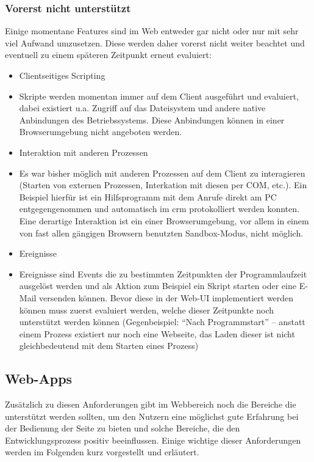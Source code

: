 \subsubsection{Vorerst nicht unterstützt}
Einige momentane Features sind im Web entweder gar nicht oder nur mit sehr viel Aufwand umzusetzen. Diese werden daher vorerst nicht weiter beachtet und eventuell zu einem späteren Zeitpunkt erneut evaluiert:

\begin{itemize}
    \item{Clientseitiges Scripting}
    \item[] Skripte werden momentan immer auf dem Client ausgeführt und evaluiert, dabei existiert u.a. Zugriff auf das Dateisystem und andere native Anbindungen des Betriebssystems. Diese Anbindungen können in einer Browserumgebung nicht angeboten werden. 
    \item{Interaktion mit anderen Prozessen}
    \item[] Es war bisher möglich mit anderen Prozessen auf dem Client zu interagieren (Starten von externen Prozessen, Interkation mit diesen per \gls{COM}, etc.). Ein Beispiel hierfür ist ein Hilfsprogramm mit dem Anrufe direkt am PC entgegengenommen und automatisch im \gls{crm} protokolliert werden konnten. Eine derartige Interaktion ist ein einer Browserumgebung, vor allem in einem von fast allen gängigen Browsern benutzten Sandbox-Modus, nicht möglich.
    \item{Ereignisse} 
    \item[] Ereignisse sind Events die zu bestimmten Zeitpunkten der Programmlaufzeit ausgelöst werden und als Aktion zum Beispiel ein Skript starten oder eine E-Mail versenden können. Bevor diese in der Web-UI implementiert werden können muss zuerst evaluiert werden, welche dieser Zeitpunkte noch unterstützt werden können (Gegenbeispiel: ``Nach Programmstart'' -- anstatt einem Prozess existiert nur noch eine Webseite, das Laden dieser ist nicht gleichbedeutend mit dem Starten eines Prozess)
\end{itemize}

\subsection{Web-Apps}
Zusätzlich zu diesen Anforderungen gibt im Webbereich noch die Bereiche die unterstützt werden sollten, um den Nutzern eine möglichst gute Erfahrung bei der Bedienung der Seite zu bieten und solche Bereiche, die den Entwicklungsprozess positiv beeinflussen. Einige wichtige dieser Anforderungen werden im Folgenden kurz vorgestellt und erläutert. 

